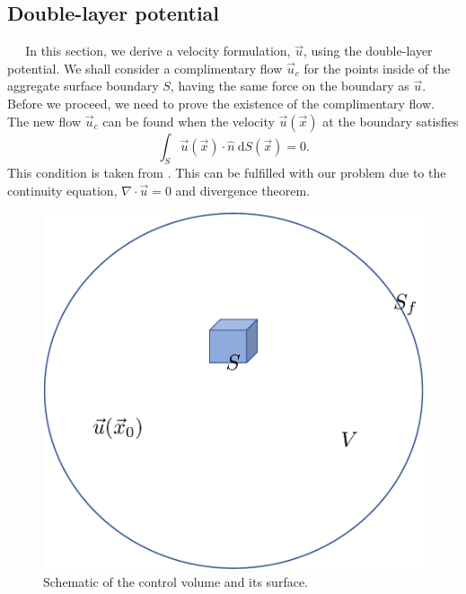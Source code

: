\subsection{Double-layer potential}
$\ \ \ \ \ $ 
In this section, we derive a velocity formulation, $\vec{u}$, using the double-layer potential. We shall consider a complimentary flow $\vec{u}_c$ 
for the points inside of the aggregate surface boundary $S$, having the same force on the boundary as $\vec{u}$. Before we proceed, we need to prove the existence of the complimentary flow.
The new flow $\vec{u}_c$ can be found when the velocity $\vec{u}(\vec{x})$ at the boundary satisfies
\begin{equation}
 	\int_S \vec{u}(\vec{x}) \cdot \hat{n} \ \text{d}S(\vec{x})=0. 
	\label{eq_dlp_constraint}
\end{equation}
This condition is taken from \cite{pozrikidis_boundary_1992}.
This can be fulfilled with our problem due to the continuity equation, $\nabla \cdot \vec{u}= 0$ and divergence theorem.
\begin{figure}[h]
	\begin{center}
		\includegraphics[scale=0.4]{./figures/fig_dlp_volume}
		\vspace{0.5cm}
	\caption{Schematic of the control volume and its surface.}
	\label{fig_dlp_volume}
\end{center}
\end{figure}
